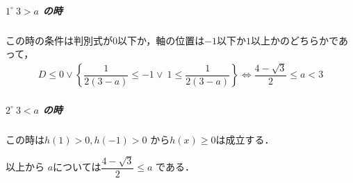 \documentclass[../../main.tex]{subfiles}
\begin{document}
\subparagraph{$1^\circ \ 3 > a$ の時}

この時の条件は判別式が$0$以下か，軸の位置は$-1$以下か$1$以上かのどちらかであって，
\begin{align}
  D \le 0 \lor \left\{ \dfrac{1}{2(3-a)} \le -1 \lor \ 1 \le \dfrac{1}{2(3-a)} \right\}
  \iff
  \dfrac{4-\sqrt{3}}{2} \le a < 3
\end{align}

\subparagraph{$2^\circ \ 3 < a$ の時}

この時は$h(1) > 0, h(-1) > 0$ から$h(x) \ge 0$は成立する．
\casesend

以上から $a$については$\dfrac{4-\sqrt{3}}{2} \le a$ である．
\end{document}
